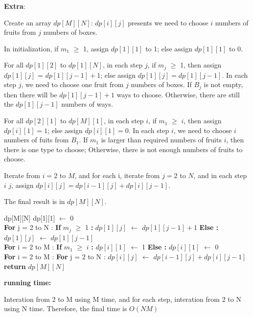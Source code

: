 \documentclass[12pt]{article}
\begin{document}
\pagebreak
\large \textbf{Extra}:\\ \vspace{5mm}\par
\normalsize 
Create an array $dp[M][N]$: $dp[i][j]$ presents we need to choose $i$ numbers of fruits from $j$ numbers of boxes. \par
In initialization, if $m_1$ $\geq$ 1, assign $dp[1][1]$ to 1; else assign $dp[1][1]$ to 0. \par
For all $dp[1][2]$ to $dp[1][N]$, in each step $j$, if $m_j$ $\geq$ 1, then assign $dp[1][j]$ = $dp[1][j - 1] + 1$; else assign $dp[1][j] = dp[1][j - 1]$. 
In each step $j$, we need to choose one fruit from $j$ numbers of boxes. 
If $B_j$ is not empty, then there will be $dp[1][j - 1] + 1$ ways to choose.
Otherwise, there are still the $dp[1][j - 1]$ numbers of ways. \par
For all $dp[2][1]$ to $dp[M][1]$, in each step $i$, if $m_1$ $\geq$ $i$, then assign $dp[i][1] = 1$; else assign $dp[i][1] = 0$. 
In each step $i$, we need to choose $i$ numbers of fuits from $B_1$.
If $m_1$ is larger than required numbers of fruits $i$, then there is one type to choose; 
Otherwise, there is not enough numbers of fruits to choose. \par
Iterate from $i = 2$ to $M$, and for each i, iterate from $j = 2$ to $N$, 
and in each step $i$ $j$, assign $dp[i][j] = dp[i - 1][j] + dp[i][j - 1]$. \par
The final result is in $dp[M][N]$.


\begin{algorithm}
\begin{algorithmic}
\State dp[M][N]
\State dp[1][1] $\leftarrow$ 0
\\
\State \textbf{For} j = 2 to N :
\State \hspace{0.4cm} \textbf{If} $m_j$ $\geq$ 1 \textbf{:}
\State \hspace{0.8cm} $dp[1][j]$ $\leftarrow$ $dp[1][j - 1] + 1$
\State \hspace{0.4cm} \textbf{Else :}
\State \hspace{0.8cm} $dp[1][j]$ $\leftarrow$ $dp[1][j - 1]$
\\
\State \textbf{For} i = 2 to M :
\State \hspace{0.4cm} \textbf{If} $m_1$ $\geq$ $i$ \textbf{:}
\State \hspace{0.8cm} $dp[i][1]$ $\leftarrow$ 1
\State \hspace{0.4cm} \textbf{Else :}
\State \hspace{0.8cm} $dp[i][1]$ $\leftarrow$ 0
\\
\State \textbf{For} i = 2 to M :
\State \hspace{0.4cm} \textbf{For} j = 2 to N :
\State \hspace{0.8cm} $dp[i][j]$ $\leftarrow$ $dp[i - 1][j] + dp[i][j - 1]$
\\
\State \textbf{return} $dp[M][N]$
\end{algorithmic}
\end{algorithm}


\textbf{running time:} \par
Interation from 2 to M using M time, and for each step, interation from 2 to N using N time.
Therefore, the final time is $O(N M)$
\end{document}
